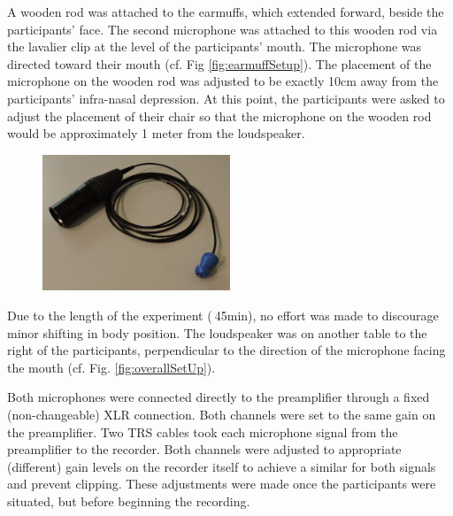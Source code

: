 \DIFdelend A wooden rod was attached to the earmuffs, which extended forward, beside the participants' face.  
The second microphone was attached to this wooden rod via the lavalier clip at the level of the participants' mouth.  The microphone was directed toward their mouth (cf. Fig \ref{fig:earmuffSetup}).  
The placement of the microphone on the wooden rod was adjusted to be exactly 10cm away from the participants' infra-nasal depression.  At this point, the participants were asked to adjust the placement of their chair so that the microphone on the wooden rod would be approximately 1 meter from the loudspeaker. 
\DIFaddbegin \begin{figure}
\includegraphics[width=0.5\textwidth]{figure/micInsertPlug.JPG}
\caption{}
\label{fig:micInsertPlug}
\end{figure}
\DIFaddend Due to the length of the experiment ($~$45min), no effort was made to discourage minor shifting in body position.  The loudspeaker was on another table to the right of the participants, perpendicular to the direction of the microphone facing the mouth (cf. Fig. \ref{fig:overallSetUp}).

Both microphones were connected directly to the preamplifier through a fixed (non-changeable) XLR connection.  Both channels were set to the same gain on the preamplifier.  Two TRS cables took each microphone signal from the preamplifier to the recorder.  Both channels were adjusted to appropriate (different) gain levels on the recorder itself to achieve a similar \DIFdelbegin {}\DIFdelend \DIFaddbegin {}\DIFaddend for both signals and prevent clipping.  These adjustments were made once the participants were situated, but before beginning the recording.

